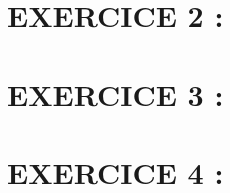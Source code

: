 \documentclass[11pt,a4paper]{article}
\begin{document}
\begin{minipage}[t]{0.1\textwidth}
\vspace{0pt}
\begin{center}
\end{center}
\end{minipage}


\vspace{0.5cm}

\section*{EXERCICE 2 : }


\begin{minipage}[t]{0.9\textwidth}


\end{minipage}


\begin{minipage}[t]{0.1\textwidth}
\vspace{0pt}
\begin{center}
\end{center}
\end{minipage}


\vspace{0.5cm}

\section*{EXERCICE 3 : }


\begin{minipage}[t]{0.9\textwidth}


\end{minipage}


\begin{minipage}[t]{0.1\textwidth}
\vspace{0pt}
\begin{center}
\end{center}
\end{minipage}


\vspace{0.5cm}

\section*{EXERCICE 4 : }


\begin{minipage}[t]{0.9\textwidth}


\end{minipage}
\end{document}
